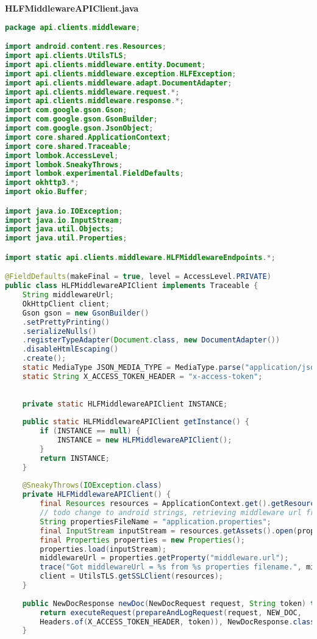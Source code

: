 \textbf{HLFMiddlewareAPIClient.java}
\begin{lstlisting}[language=Java]
package api.clients.middleware;

import android.content.res.Resources;
import api.clients.UtilsTLS;
import api.clients.middleware.entity.Document;
import api.clients.middleware.exception.HLFException;
import api.clients.middleware.adapt.DocumentAdapter;
import api.clients.middleware.request.*;
import api.clients.middleware.response.*;
import com.google.gson.Gson;
import com.google.gson.GsonBuilder;
import com.google.gson.JsonObject;
import core.shared.ApplicationContext;
import core.shared.Traceable;
import lombok.AccessLevel;
import lombok.SneakyThrows;
import lombok.experimental.FieldDefaults;
import okhttp3.*;
import okio.Buffer;

import java.io.IOException;
import java.io.InputStream;
import java.util.Objects;
import java.util.Properties;

import static api.clients.middleware.HLFMiddlewareEndpoints.*;

@FieldDefaults(makeFinal = true, level = AccessLevel.PRIVATE)
public class HLFMiddlewareAPIClient implements Traceable {
	String middlewareUrl;
	OkHttpClient client;
	Gson gson = new GsonBuilder()
	.setPrettyPrinting()
	.serializeNulls()
	.registerTypeAdapter(Document.class, new DocumentAdapter())
	.disableHtmlEscaping()
	.create();
	static MediaType JSON_MEDIA_TYPE = MediaType.parse("application/json; charset=utf-8");
	static String X_ACCESS_TOKEN_HEADER = "x-access-token";
	
	
	private static HLFMiddlewareAPIClient INSTANCE;
	
	public static HLFMiddlewareAPIClient getInstance() {
		if (INSTANCE == null) {
			INSTANCE = new HLFMiddlewareAPIClient();
		}
		return INSTANCE;
	}
	
	@SneakyThrows(IOException.class)
	private HLFMiddlewareAPIClient() {
		final Resources resources = ApplicationContext.get().getResources();
		// todo change to android strings, retrieving middleware url from application properties
		String propertiesFileName = "application.properties";
		final InputStream inputStream = resources.getAssets().open(propertiesFileName);
		final Properties properties = new Properties();
		properties.load(inputStream);
		middlewareUrl = properties.getProperty("middleware.url");
		trace("Got middlewareUrl = %s from %s properties filename.", middlewareUrl, propertiesFileName);
		client = UtilsTLS.getSSLClient(resources);
	}
	
	public NewDocResponse newDoc(NewDocRequest request, String token) throws HLFException {
		return executeRequest(prepareAndLogRequest(request, NEW_DOC,
		Headers.of(X_ACCESS_TOKEN_HEADER, token)), NewDocResponse.class);
	}
	

\end{lstlisting}
